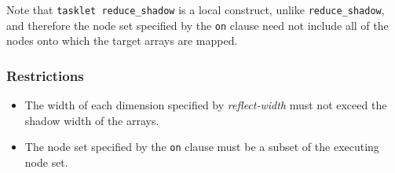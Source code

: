Note that \verb|tasklet reduce_shadow| is a local construct, unlike
\verb|reduce_shadow|, and therefore the node set specified by the
\verb|on| clause need not include all of the nodes onto which the target
arrays are mapped.

\subsubsection*{Restrictions}

\begin{itemize}
 \item The width of each dimension specified by {\it
       reflect-width} must not exceed the shadow width of the arrays.
 \item The node set specified by the {\tt on} clause must be a subset of the
       executing node set.
\end{itemize}
